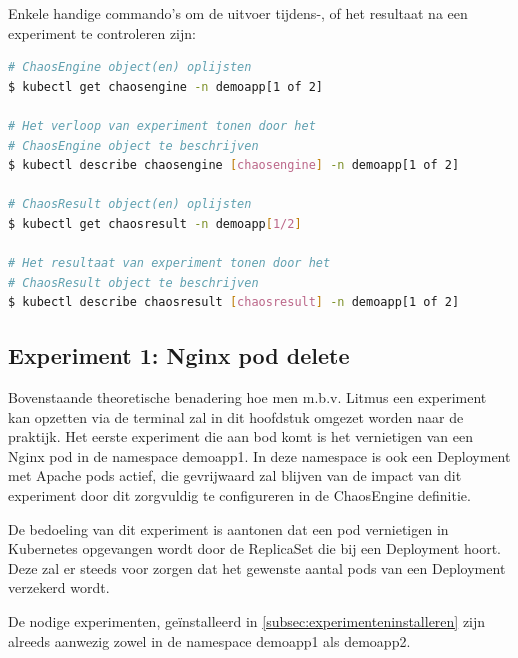 Enkele handige commando's om de uitvoer tijdens-, of het resultaat na een experiment te controleren zijn:
\begin{lstlisting}[language=bash]
# ChaosEngine object(en) oplijsten
$ kubectl get chaosengine -n demoapp[1 of 2]

# Het verloop van experiment tonen door het 
# ChaosEngine object te beschrijven
$ kubectl describe chaosengine [chaosengine] -n demoapp[1 of 2]

# ChaosResult object(en) oplijsten
$ kubectl get chaosresult -n demoapp[1/2]

# Het resultaat van experiment tonen door het 
# ChaosResult object te beschrijven
$ kubectl describe chaosresult [chaosresult] -n demoapp[1 of 2]
\end{lstlisting}

\subsection{Experiment 1: Nginx pod delete}

Bovenstaande theoretische benadering hoe men m.b.v. Litmus een experiment kan opzetten via de terminal zal in dit hoofdstuk omgezet worden naar de praktijk. Het eerste experiment die aan bod komt is het vernietigen van een Nginx pod in de namespace demoapp1. In deze namespace is ook een Deployment met Apache pods actief, die gevrijwaard zal blijven van de impact van dit experiment door dit zorgvuldig te configureren in de ChaosEngine definitie. 

De bedoeling van dit experiment is aantonen dat een pod vernietigen in Kubernetes opgevangen wordt door de ReplicaSet die bij een Deployment hoort. Deze zal er steeds voor zorgen dat het gewenste aantal pods van een Deployment verzekerd wordt.    

De nodige experimenten, geïnstalleerd in \ref{subsec:experimenteninstalleren} zijn alreeds aanwezig zowel in de namespace demoapp1 als demoapp2.
  
